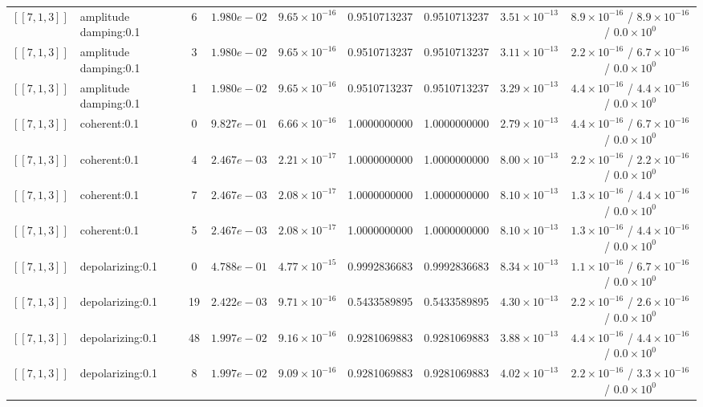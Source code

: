 \documentclass[10pt,a4paper]{article}
\begin{document}
\begin{longtable}{llccccccc}
$[\![7,1,3]\!]$ & amplitude damping:0.1 & 6 & $1.980e-02$ & $9.65\times 10^{-16}$ & 0.9510713237 & 0.9510713237 & $3.51\times 10^{-13}$ & $8.9\times 10^{-16}$ / $8.9\times 10^{-16}$ / $0.0\times 10^{0}$ \\
$[\![7,1,3]\!]$ & amplitude damping:0.1 & 3 & $1.980e-02$ & $9.65\times 10^{-16}$ & 0.9510713237 & 0.9510713237 & $3.11\times 10^{-13}$ & $2.2\times 10^{-16}$ / $6.7\times 10^{-16}$ / $0.0\times 10^{0}$ \\
$[\![7,1,3]\!]$ & amplitude damping:0.1 & 1 & $1.980e-02$ & $9.65\times 10^{-16}$ & 0.9510713237 & 0.9510713237 & $3.29\times 10^{-13}$ & $4.4\times 10^{-16}$ / $4.4\times 10^{-16}$ / $0.0\times 10^{0}$ \\
$[\![7,1,3]\!]$ & coherent:0.1 & 0 & $9.827e-01$ & $6.66\times 10^{-16}$ & 1.0000000000 & 1.0000000000 & $2.79\times 10^{-13}$ & $4.4\times 10^{-16}$ / $6.7\times 10^{-16}$ / $0.0\times 10^{0}$ \\
$[\![7,1,3]\!]$ & coherent:0.1 & 4 & $2.467e-03$ & $2.21\times 10^{-17}$ & 1.0000000000 & 1.0000000000 & $8.00\times 10^{-13}$ & $2.2\times 10^{-16}$ / $2.2\times 10^{-16}$ / $0.0\times 10^{0}$ \\
$[\![7,1,3]\!]$ & coherent:0.1 & 7 & $2.467e-03$ & $2.08\times 10^{-17}$ & 1.0000000000 & 1.0000000000 & $8.10\times 10^{-13}$ & $1.3\times 10^{-16}$ / $4.4\times 10^{-16}$ / $0.0\times 10^{0}$ \\
$[\![7,1,3]\!]$ & coherent:0.1 & 5 & $2.467e-03$ & $2.08\times 10^{-17}$ & 1.0000000000 & 1.0000000000 & $8.10\times 10^{-13}$ & $1.3\times 10^{-16}$ / $4.4\times 10^{-16}$ / $0.0\times 10^{0}$ \\
$[\![7,1,3]\!]$ & depolarizing:0.1 & 0 & $4.788e-01$ & $4.77\times 10^{-15}$ & 0.9992836683 & 0.9992836683 & $8.34\times 10^{-13}$ & $1.1\times 10^{-16}$ / $6.7\times 10^{-16}$ / $0.0\times 10^{0}$ \\
$[\![7,1,3]\!]$ & depolarizing:0.1 & 19 & $2.422e-03$ & $9.71\times 10^{-16}$ & 0.5433589895 & 0.5433589895 & $4.30\times 10^{-13}$ & $2.2\times 10^{-16}$ / $2.6\times 10^{-16}$ / $0.0\times 10^{0}$ \\
$[\![7,1,3]\!]$ & depolarizing:0.1 & 48 & $1.997e-02$ & $9.16\times 10^{-16}$ & 0.9281069883 & 0.9281069883 & $3.88\times 10^{-13}$ & $4.4\times 10^{-16}$ / $4.4\times 10^{-16}$ / $0.0\times 10^{0}$ \\
$[\![7,1,3]\!]$ & depolarizing:0.1 & 8 & $1.997e-02$ & $9.09\times 10^{-16}$ & 0.9281069883 & 0.9281069883 & $4.02\times 10^{-13}$ & $2.2\times 10^{-16}$ / $3.3\times 10^{-16}$ / $0.0\times 10^{0}$ \\

\end{longtable}
\end{document}
